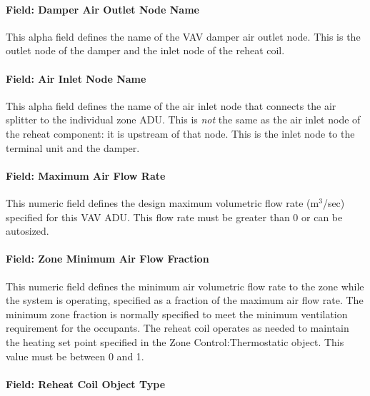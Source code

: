 \paragraph{Field: Damper Air Outlet Node Name}\label{field-damper-air-outlet-node-name-1}

This alpha field defines the name of the VAV damper air outlet node. This is the outlet node of the damper and the inlet node of the reheat coil.

\paragraph{Field: Air Inlet Node Name}\label{field-air-inlet-node-name-3}

This alpha field defines the name of the air inlet node that connects the air splitter to the individual zone ADU. This is \emph{not} the same as the air inlet node of the reheat component: it is upstream of that node. This is the inlet node to the terminal unit and the damper.

\paragraph{Field: Maximum Air Flow Rate}\label{field-maximum-air-flow-rate-3}

This numeric field defines the design maximum volumetric flow rate (m\(^{3}\)/sec) specified for this VAV ADU. This flow rate must be greater than 0 or can be autosized.

\paragraph{Field: Zone Minimum Air Flow Fraction}\label{field-zone-minimum-air-flow-fraction-1}

This numeric field defines the minimum air volumetric flow rate to the zone while the system is operating, specified as a fraction of the maximum air flow rate. The minimum zone fraction is normally specified to meet the minimum ventilation requirement for the occupants. The reheat coil operates as needed to maintain the heating set point specified in the Zone Control:Thermostatic object. This value must be between 0 and 1.

\paragraph{Field: Reheat Coil Object Type}\label{field-reheat-coil-object-type-2}

